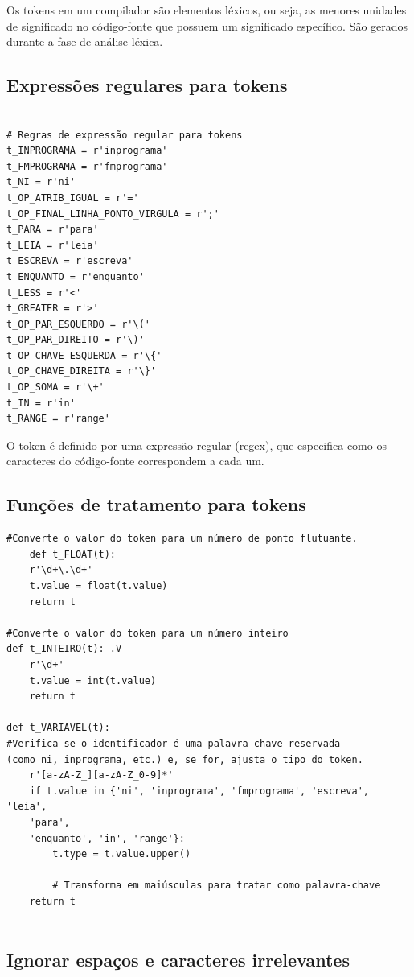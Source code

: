 \documentclass[a4paper,12pt]{article}
\begin{document}
Os tokens em um compilador são elementos léxicos, ou seja, as menores 
unidades de significado no código-fonte que possuem um significado 
específico. São gerados durante a fase de análise léxica.


\subsection{Expressões regulares para tokens}

\begin{Verbatim}

# Regras de expressão regular para tokens
t_INPROGRAMA = r'inprograma'
t_FMPROGRAMA = r'fmprograma'
t_NI = r'ni'
t_OP_ATRIB_IGUAL = r'='
t_OP_FINAL_LINHA_PONTO_VIRGULA = r';'
t_PARA = r'para'
t_LEIA = r'leia'
t_ESCREVA = r'escreva'
t_ENQUANTO = r'enquanto'
t_LESS = r'<'
t_GREATER = r'>'
t_OP_PAR_ESQUERDO = r'\('
t_OP_PAR_DIREITO = r'\)'
t_OP_CHAVE_ESQUERDA = r'\{'
t_OP_CHAVE_DIREITA = r'\}'
t_OP_SOMA = r'\+'
t_IN = r'in'
t_RANGE = r'range'
\end{Verbatim}

O token é definido por uma expressão regular (regex), que especifica 
como os caracteres do código-fonte correspondem a cada um.

\subsection{Funções de tratamento para tokens}

\begin{Verbatim}
#Converte o valor do token para um número de ponto flutuante.
    def t_FLOAT(t): 
    r'\d+\.\d+'
    t.value = float(t.value)
    return t
    
#Converte o valor do token para um número inteiro
def t_INTEIRO(t): .V
    r'\d+'
    t.value = int(t.value)
    return t

def t_VARIAVEL(t): 
#Verifica se o identificador é uma palavra-chave reservada 
(como ni, inprograma, etc.) e, se for, ajusta o tipo do token.
    r'[a-zA-Z_][a-zA-Z_0-9]*'
    if t.value in {'ni', 'inprograma', 'fmprograma', 'escreva', 'leia', 
    'para', 
    'enquanto', 'in', 'range'}:
        t.type = t.value.upper()  
        
        # Transforma em maiúsculas para tratar como palavra-chave
    return t
    
\end{Verbatim}

\subsection{Ignorar espaços e caracteres irrelevantes}
\end{document}
